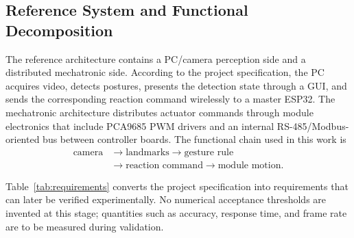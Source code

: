 \documentclass[lettersize,journal]{IEEEtran}
\begin{document}
\subsection{Reference System and Functional Decomposition}
\label{sec:reference-system}

The reference architecture contains a PC/camera perception side and a distributed mechatronic side. According to the project specification, the PC acquires video, detects postures, presents the detection state through a GUI, and sends the corresponding reaction command wirelessly to a master ESP32. The mechatronic architecture distributes actuator commands through module electronics that include PCA9685 PWM drivers and an internal RS-485/Modbus-oriented bus between controller boards. The functional chain used in this work is
\begin{equation}
\begin{aligned}
\text{camera} &\rightarrow \text{landmarks} \rightarrow \text{gesture rule}\\
&\rightarrow \text{reaction command} \rightarrow \text{module motion}.
\end{aligned}
\label{eq:functional-chain}
\end{equation}

Table~\ref{tab:requirements} converts the project specification into requirements that can later be verified experimentally. No numerical acceptance thresholds are invented at this stage; quantities such as accuracy, response time, and frame rate are to be measured during validation.
\end{document}
